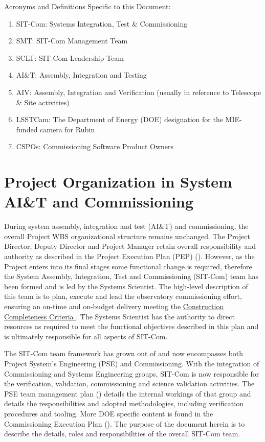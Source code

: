 \documentclass[SE,lsstdraft,authoryear,toc]{lsstdoc, lsstdraft}
\begin{document}
Acronyms and Definitions Specific to this Document:
\begin{enumerate}
    \item SIT-Com: Systems Integration, Test \& Commissioning
    \item SMT: SIT-Com Management Team
    \item SCLT: SIT-Com Leadership Team
    \item AI\&T: Assembly, Integration and Testing
    \item AIV: Assembly, Integration and Verification (usually in reference to Telescope \& Site activities)
    \item LSSTCam: The Department of Energy (DOE) designation for the MIE-funded camera for Rubin
    \item CSPOs: Commissioning Software Product Owners
\end{enumerate}

\section{Project Organization in System AI\&T and Commissioning}
\label{sec:project_organization}

During system assembly, integration and test (AI\&T) and commissioning, the overall Project WBS organizational structure remains unchanged.
The Project Director, Deputy Director and Project Manager retain overall responsibility and authority as described in the Project Execution Plan (PEP) ().
However, as the Project enters into its final stages some functional change is required, therefore the System Assembly, Integration, Test and Commissioning (SIT-Com) team has been formed and is led by the Systems Scientist.
The high-level description of this team is to plan, execute and lead the observatory commissioning effort, ensuring an on-time and on-budget delivery meeting the \href{https://sitcomtn-005.lsst.io}{Construction Completeness Criteria }.
The Systems Scientist has the authority to direct resources as required to meet the functional objectives described in this plan and is ultimately responsible for all aspects of SIT-Com.

The SIT-Com team framework has grown out of and now encompasses both Project System's Engineering (PSE) and Commissioning.
With the integration of Commissioning and Systems Engineering groups, SIT-Com is now responsible for the verification, validation, commissioning and science validation activities.
The PSE team management plan () details the internal workings of that group and details the responsibilities and adopted methodologies, including verification procedures and tooling.
More DOE specific content is found in the Commissioning Execution Plan ().
The purpose of the document herein is to describe the details, roles and responsibilities of the overall SIT-Com team.
\end{document}
